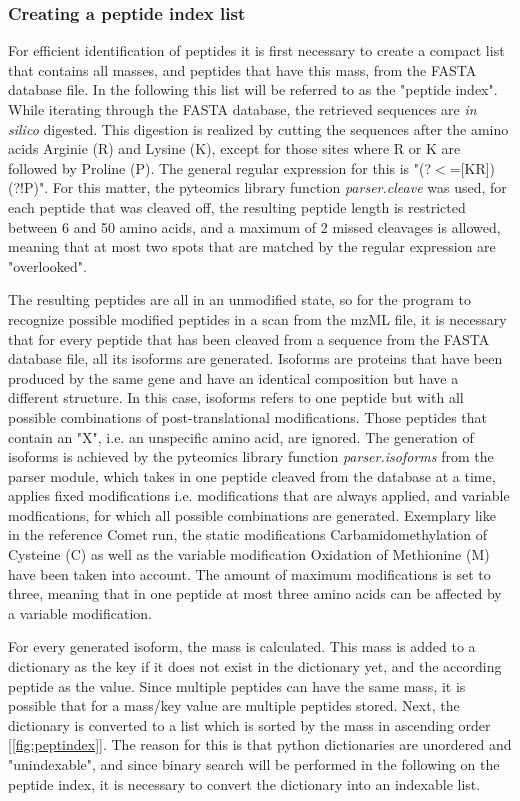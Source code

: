 \documentclass[11pt]{article}
\begin{document}
\subsubsection{Creating a peptide index list}
For efficient identification of peptides it is first necessary to create a compact list that contains all masses, and peptides that have this mass, from the FASTA database file. In the following this list will be referred to as the "peptide index". While iterating through the FASTA database, the retrieved sequences are \textit{in silico} digested. This digestion is realized by cutting the sequences after the amino acids Arginie (R) and Lysine (K), except for those sites where R or K are followed by Proline (P). The general regular expression for this is "(?$<$=[KR])(?!P)". For this matter, the pyteomics library function \textit{parser.cleave} was used, for each peptide that was cleaved off, the resulting peptide length is restricted between 6 and 50 amino acids, and a maximum of 2 missed cleavages is allowed, meaning that at most two spots that are matched by the regular expression are "overlooked". 

The resulting peptides are all in an unmodified state, so for the program to recognize possible modified peptides in a scan from the mzML file, it is necessary that for every peptide that has been cleaved from a sequence from the FASTA database file, all its isoforms are generated. Isoforms are proteins that have been produced by the same gene and have an identical composition but have a different structure. In this case, isoforms refers to one peptide but with all possible combinations of post-translational modifications. Those peptides that contain an "X", i.e. an unspecific amino acid, are ignored. The generation of isoforms is achieved by the pyteomics library function \textit{parser.isoforms} from the parser module, which takes in one peptide cleaved from the database at a time, applies fixed modifications i.e. modifications that are always applied, and variable modfications, for which all possible combinations are generated. Exemplary like in the reference Comet run, the static modifications Carbamidomethylation of Cysteine (C) as well as the variable modification Oxidation of Methionine (M) have been taken into account. The amount of maximum modifications is set to three, meaning that in one peptide at most three amino acids can be affected by a variable modification.

For every generated isoform, the mass is calculated. This mass is added to a dictionary as the key if it does not exist in the dictionary yet, and the according peptide as the value. Since multiple peptides can have the same mass, it is possible that for a mass/key value are multiple peptides stored. Next, the dictionary is converted to a list which is sorted by the mass in ascending order [\cref{fig:peptindex}]. The reason for this is that python dictionaries are unordered and "unindexable", and since binary search will be performed in the following on the peptide index, it is necessary to convert the dictionary into an indexable list.
 
\end{document}
